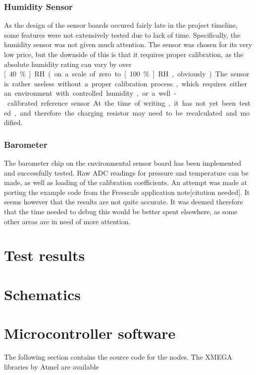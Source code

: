 \subsubsection{Humidity Sensor}
\label{sub2:humidity}
As the design of the sensor boards occured fairly late in the project timeline,
some features were not extensively tested due to lack of time. Specifically, the
humidity sensor was not given much attention. The sensor was chosen for its very
low price, but the downside of this is that it requires proper calibration, as
the absolute humidity rating can vary by over \unit[40\%]{RH} (on a scale of
zero to \unit[100\%]{RH}, obviously). The sensor is rather useless without a
proper calibration process, which requires either an environment with controlled
humidity, or a well-calibrated reference sensor. At the time of writing, it has
not yet been tested, and therefore the charging resistor may need to be
recalculated and modified.

\subsubsection{Barometer}
\label{sub2:barometer}
The barometer chip on the environmental sensor board has been implemented and
successfully tested. Raw ADC readings for pressure and temperature can be made,
as well as loading of the calibration coefficients. An attempt was made
at porting the example code from the Freescale application note[citation
needed].
It seems however that the results are not quite accurate. It was deemed
therefore that the time needed to debug this would be better spent elsewhere, as
some other areas are in need of more attention.


\section{Test results}




\pagebreak
\appendix

\section{Schematics}

\section{Microcontroller software}
The following section contains the source code for the nodes. The XMEGA
libraries by Atmel are available %

